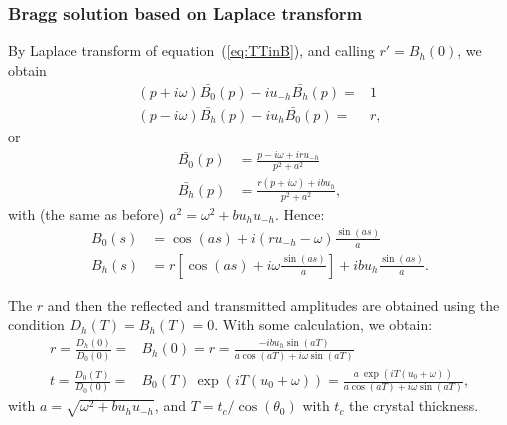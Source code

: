 \documentclass[preprint]{iucr}              %
\newcommand{\inblue}[1]{{\color{blue}#1}}
\begin{document}
\subsubsection{Bragg solution based on Laplace transform}By Laplace transform of equation~(\ref{eq:TTinB}), and calling $r'=B_h(0)$, we obtain
\begin{subequations}
\label{eq:TTbraggLaplace}
\begin{align}
(p + i \omega) \bar{B_0}(p) - i u_{-h} \bar{B_h}(p)= & 1 \nonumber \\
(p - i \omega) \bar{B_h}(p) - i u_{h} \bar{B_0}(p)= & r, \nonumber
\end{align}
\end{subequations}
or 
\begin{subequations}
\begin{align}
\bar{B_0}(p) &= \frac{p - i \omega + i r u_{-h}}{p^2 + a^2} \nonumber \\
\bar{B_h}(p) &= \frac{r (p + i \omega) + i b u_h}{p^2 + a^2}, \nonumber
\end{align}
\end{subequations}
with (the same as before) $a^2=\omega^2+b u_h u_{-h}$. Hence:
\begin{subequations}
\begin{align}
B_0(s) &= \cos(a s) + i (r u_{-h} - \omega) \frac{\sin(a s)}{a} \nonumber \\
B_h(s) &= r [\cos(a s) + i \omega \frac{\sin(a s)}{a}] + i b u_h \frac{\sin(a s)}{a}. \nonumber
\end{align}
\end{subequations}

The \inblue{$r$} and then the reflected and transmitted amplitudes are obtained using the condition $D_h(T)=B_h(T)=0$. With some calculation, we obtain: 
\begin{subequations}
\begin{align}
r=\frac{D_h(0)}{D_0(0)} =& B_h(0) = r = \frac{-i b u_h \sin(a T)}{a \cos(a T) + i\omega \sin(a T)} \nonumber \\
t =\frac{D_0(T)}{D_0(0)}= & B_0(T) ~ \exp(i T (u_0+\omega)) = \frac{a~\exp(i T (u_0+\omega))}{a \cos(a T) + i\omega \sin(a T)} , \nonumber
\end{align}
\end{subequations}
with $a=\sqrt{\omega^2 + b u_h u_{-h}}$, and  
$T=t_c/\cos(\theta_0)$ with $t_c$ the crystal thickness.

\end{document}
